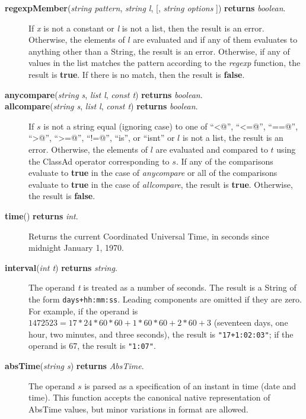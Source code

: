 \documentclass{article}
\begin{document}
\begin{description}
\item[\textbf{regexpMember}(\emph{string pattern}, \emph{string l},
{[}, \emph{string options} {]}) \textbf{returns} \emph{boolean}.]

If \emph{x} is not a constant or \emph{l} is not a list, then the
result is an error.  Otherwise, the elements of $l$ are evaluated and if any of
them evaluates to anything other than a String, the result is an error.
Otherwise, if any of values in the list matches the pattern according to
the \emph{regexp} function, the result is \textbf{true}.   If there is no match,
then the result is \textbf{false}.

\item[\textbf{anycompare}(\emph{string s}, \emph{list l}, \emph{const t}) 
\textbf{returns} \emph{boolean}.]  
\item[\textbf{allcompare}(\emph{string s}, \emph{list l}, \emph{const t}) 
\textbf{returns} \emph{boolean}.]  
If $s$ is not a string equal (ignoring case) to one of
``\verb@<@'', ``\verb@<=@'',
``\verb@==@'', ``\verb@>@'', ``\verb@>=@'', ``\verb@!=@'', ``is'', or
``isnt'' or $l$ is not a list, the result is an error.  Otherwise, the
elements of $l$ are evaluated and compared to $t$ using the ClassAd operator
corresponding to $s$.  If any of the comparisons evaluate to \textbf{true} in
the case of \emph{anycompare} or all of the comparisons evaluate to
\textbf{true} in the case of \emph{allcompare}, the result is \textbf{true}.
Otherwise, the result is \textbf{false}.

\item[\textbf{time}() \textbf{returns} \emph{int}.]

Returns the current Coordinated Universal Time, in seconds
since midnight January 1, 1970.

\item[\textbf{interval}(\emph{int t}) \textbf{returns} \emph{string}.]

The operand \emph{t} is treated as a number of seconds.
The result is a String of the form \texttt{days+hh:mm:ss}.
Leading components are omitted if they are zero.  For example, if the
operand is $1472523 = 17*24*60*60 + 1*60*60 + 2*60 + 3$
(seventeen days, one hour, two
minutes, and three seconds), the result is \texttt{"17+1:02:03"};
if the operand is 67, the result is \texttt{"1:07"}.

\item[\textbf{absTime}(\emph{string s}) \textbf{returns} \emph{AbsTime}.]

The operand $s$ is parsed as a specification of an instant in time (date and
time). 
This function accepts the canonical native representation of AbsTime values,
but minor variations in format are allowed.


\end{description}
\end{document}
